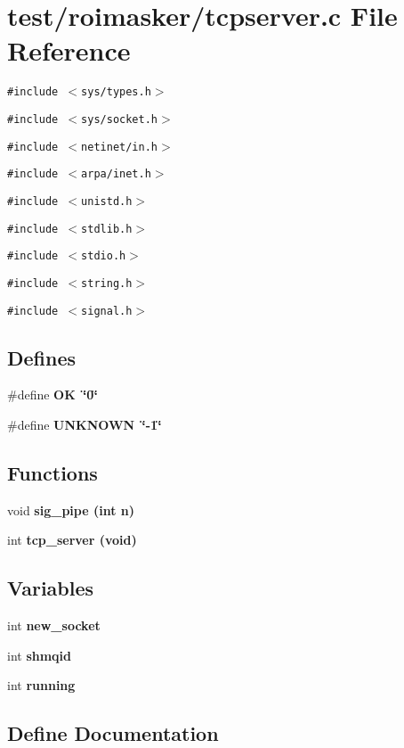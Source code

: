 \section{test/roimasker/tcpserver.c File Reference}
\label{roimasker_2tcpserver_8c}
{\tt \#include $<$sys/types.h$>$}\par
{\tt \#include $<$sys/socket.h$>$}\par
{\tt \#include $<$netinet/in.h$>$}\par
{\tt \#include $<$arpa/inet.h$>$}\par
{\tt \#include $<$unistd.h$>$}\par
{\tt \#include $<$stdlib.h$>$}\par
{\tt \#include $<$stdio.h$>$}\par
{\tt \#include $<$string.h$>$}\par
{\tt \#include $<$signal.h$>$}\par
\subsection*{Defines}
\begin{CompactItemize}
\item 
\#define \bf{OK}~\char`\"{}0\char`\"{}
\item 
\#define \bf{UNKNOWN}~\char`\"{}-1\char`\"{}
\end{CompactItemize}
\subsection*{Functions}
\begin{CompactItemize}
\item 
void \bf{sig\_\-pipe} (int \bf{n})
\item 
int \bf{tcp\_\-server} (void)
\end{CompactItemize}
\subsection*{Variables}
\begin{CompactItemize}
\item 
int \bf{new\_\-socket}
\item 
int \bf{shmqid}
\item 
int \bf{running}
\end{CompactItemize}


\subsection{Define Documentation}

